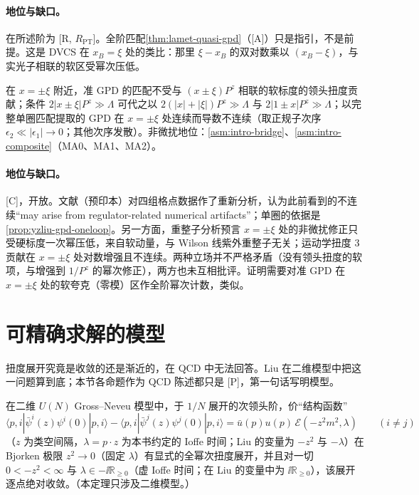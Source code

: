 \paragraph{地位与缺口。}在所述阶为 [R, $R_{\mathrm{PT}}$]。全阶匹配\cref{thm:lamet-quasi-gpd}（[A]）只是指引，不是前提。这是 DVCS 在 $x_B=\xi$ 处的类比：那里 $\xi-x_B$ 的双对数乘以 $(x_B-\xi)$，与实光子相联的软区受幂次压低\cite{JiOsborne1998,CollinsFreund1999,Radyushkin1997}。

\begin{conjecture}[GPD 在 $x=\pm\xi$ 附近的 LaMET 可计算性 \tagC]\label{conj:yzliu-gpd-xi}
在 $x=\pm\xi$ 附近，准 GPD 的匹配不受与 $(x\pm\xi)P^z$ 相联的软标度的领头扭度贡献；条件 $2|x\pm\xi|P^z\gg\Lambda$ 可代之以 $2(|x|+|\xi|)P^z\gg\Lambda$ 与 $2|1\pm x|P^z\gg\Lambda$；以完整单圈匹配提取的 GPD 在 $x=\pm\xi$ 处连续而导数不连续（取正规子次序 $\epsilon_2\ll|\epsilon_1|\to0$；其他次序发散）\cite{Su:2026eta}。非微扰地位：\cref{asm:intro-bridge}、\cref{asm:intro-composite}（MA0、MA1、MA2）。
\end{conjecture}

\paragraph{地位与缺口。}[C]，开放。文献\cite{Su:2026eta}（预印本）对四组格点数据作了重新分析，认为此前看到的不连续“may arise from regulator-related numerical artifacts”；单圈的依据是\cref{prop:yzliu-gpd-oneloop}。另一方面，重整子分析预言 $x=\pm\xi$ 处的非微扰修正只受硬标度一次幂压低，来自软动量，与 Wilson 线紫外重整子无关\cite{Braun:2024snf}；运动学扭度 3 贡献在 $x=\pm\xi$ 处对数增强且不连续\cite{Braun:2023alc}。两种立场并不严格矛盾（没有领头扭度的软项，与增强到 $1/P^z$ 的幂次修正），两方也未互相批评。证明需要对准 GPD 在 $x=\pm\xi$ 处的软夸克（零模）区作全阶幂次计数，类似\cite{CollinsFreund1999}。

\section{可精确求解的模型}\label{sec:yzliu-models}

扭度展开究竟是收敛的还是渐近的，在 QCD 中无法回答。Liu 在二维模型中把这一问题算到底；本节各命题作为 QCD 陈述都只是 [P]，第一句话写明模型。

\begin{theorem}\label{thm:yzliu-gn-convergence}
在二维 $U(N)$ Gross--Neveu 模型中，于 $1/N$ 展开的次领头阶，价“结构函数” %
\begin{equation}\label{eq:yzliu-gn-sf}
\langle p,i|\bar\psi^i(z)\psi^i(0)|p,i\rangle-\langle p,i|\bar\psi^j(z)\psi^j(0)|p,i\rangle=\bar u(p)u(p)\,\mathcal E(-z^2m^2,\lambda)\qquad(i\ne j)
\end{equation}
（$z$ 为类空间隔，$\lambda=p\cdot z$ 为本书约定的 Ioffe 时间；Liu 的变量为 $-z^2$ 与 $-\lambda$）在 Bjorken 极限 $z^2\to0$（固定 $\lambda$）有显式的全幂次扭度展开，并且对一切 $0<-z^2<\infty$ 与 $\lambda\in-\ii\mathbb R_{\ge0}$（虚 Ioffe 时间；在 Liu 的变量中为 $\ii\mathbb R_{\ge0}$），该展开逐点绝对收敛。（本定理只涉及二维模型。）
\end{theorem}

